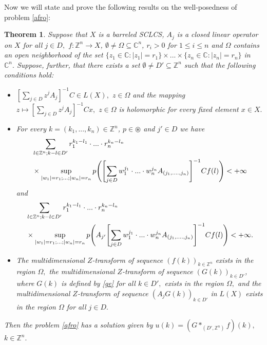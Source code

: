 \documentclass{amsart}
\newtheorem{thm}{Theorem}[section]
\theoremstyle{definition}
\theoremstyle{remark}
\numberwithin{equation}{section}
\begin{document}
Now we will state and prove the following results on the well-posedness of problem \eqref{afro}:

\begin{thm}\label{moves}
Suppose that $X$ is a barreled \emph{SCLCS}, $A_{j}$ is a closed linear operator on $X$ for all $j\in D,$ $f: {\mathbb Z}^{n} \rightarrow X$, $\emptyset \neq \Omega \subseteq {\mathbb C}^{n}$, $r_{i}>0$ for $1\leq i\leq n$ and $\Omega$ contains an open neighborhood of the set $\{z_{1}\in {\mathbb C} : |z_{1}|=r_{1}\} \times ... \times \{z_{n}\in {\mathbb C} : |z_{n}|=r_{n}\}$ in ${\mathbb C}^{n}.$ 
Suppose, further, that there exists a set $\emptyset \neq D' \subseteq {\mathbb Z}^{n}$ such that the following conditions hold:
\begin{itemize}
\item[(i)] $[\sum_{j\in D}z^{j}A_{j}]^{-1}C\in L(X),$ $z\in \Omega$ and the mapping $z\mapsto [\sum_{j\in D}z^{j}A_{j}]^{-1}Cx,$ $z\in \Omega$ is holomorphic for every fixed element $x\in X.$
\item[(ii)] For every $k=(k_{1},...,k_{n})\in {\mathbb Z}^{n}$, $p\in \circledast $ and $j'\in D$ we have
\begin{align} & \label{afro5}
\sum_{l\in {\mathbb Z}^{n}; k-l\in D'}r_{1}^{k_{1}-l_{1}}\cdot ... \cdot r_{n}^{k_{n}-l_{n}} \\ \notag &  \times \sup_{|w_{1}|=r_{1};...;|w_{n}|=r_{n}} p\Biggl( \Biggl[\sum_{j\in D}w_{1}^{j_{1}}\cdot ... \cdot w_{n}^{j_{n}}A_{(j_{1},....,j_{n})}\Biggr]^{-1}Cf(l)\Biggr) <+\infty
\end{align}
and
\begin{align} & \notag
\sum_{l\in {\mathbb Z}^{n}; k-l\in D'}r_{1}^{k_{1}-l_{1}}\cdot ... \cdot r_{n}^{k_{n}-l_{n}}
\\\label{afro51} & \times \sup_{|w_{1}|=r_{1};...;|w_{n}|=r_{n}} p\Biggl( A_{j'}\Biggl[\sum_{j\in D}w_{1}^{j_{1}}\cdot ... \cdot w_{n}^{j_{n}}A_{(j_{1},....,j_{n})}\Biggr]^{-1}Cf(l)\Biggr)<+\infty .
\end{align}
\item[(iii)] The multidimensional $Z$-transform of sequence $(f(k))_{k\in {\mathbb Z}^{n}}$ exists in the region $\Omega ,$ the multidimensional $Z$-transform of sequence $(G(k))_{k\in D'}$, where $G(k)$ is defined by \eqref{ge} for all $k\in D',$ exists in the region $\Omega ,$ and the multidimensional $Z$-transform of sequence $(A_{j}G(k))_{k\in D'}$ in $L(X)$ exists in the region $\Omega$ for all $j\in D.$
\end{itemize} 
Then the problem \eqref{afro} has a solution given by $u(k)= (G\ast_{(D',{\mathbb Z}^{n})} f)(k),$ $k\in {\mathbb Z}^{n}.$ 
\end{thm} 
\end{document}
